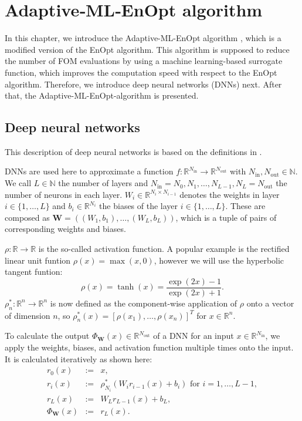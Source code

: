 \chapter{Adaptive‑ML‑EnOpt algorithm}

In this chapter, we introduce the Adaptive-ML-EnOpt algorithm \cite{Keil2022-dj}, which is a modified version of the EnOpt algorithm. This algorithm is supposed to reduce the number of FOM evaluations by using a machine learning-based surrogate function, which improves the computation speed with respect to the EnOpt algorithm. Therefore, we introduce deep neural networks (DNNs) next. After that, the Adaptive-ML-EnOpt-algorithm is presented.

\section{Deep neural networks}

This description of deep neural networks is based on the definitions in \cite{Keil2022-dj}.

DNNs are used here to approximate a function $f:\mathbb{R}^{N_{\mathrm{in}}}\to\mathbb{R}^{N_{\mathrm{out}}}$ with $N_{\mathrm{in}},N_{\mathrm{out}}\in\mathbb{N}$. We call $L\in\mathbb{N}$ the number of layers and $N_{\mathrm{in}}=N_0,N_1,\dotsc,N_{L-1}, N_L=N_{\mathrm{out}}$ the number of neurons in each layer. $W_i\in\mathbb{R}^{N_i\times N_{i-1}}$ denotes the weights in layer $i\in\{1,\dotsc,L\}$ and $b_i\in\mathbb{R}^{N_i}$ the biases of the layer $i\in\{1,\dotsc,L\}$. These are composed as $\mathbf{W}=\left((W_1,b_1),\dotsc,(W_L,b_L)\right)$, which is a tuple of pairs of corresponding weights and biases.

$\rho:\mathbb{R}\to\mathbb{R}$ is the so-called activation function. A popular example is the rectified linear unit funtion $\rho(x)=\operatorname{max}(x,0)$, however we will use the hyperbolic tangent funtion:
\begin{displaymath}
\rho(x)=\tanh(x)=\frac{\exp(2x)-1}{\exp(2x)+1}.
\end{displaymath}
$\rho_n^*:\mathbb{R}^n\to\mathbb{R}^n$ is now defined as the component-wise application of $\rho$ onto a vector of dimension $n$, so $\rho_n^*(x)=\left[\rho(x_1),\dotsc,\rho(x_n)\right]^T$ for $x\in\mathbb{R}^n$.

To calculate the output $\Phi_\mathbf{W}(x)\in\mathbb{R}^{N_{\mathrm{out}}}$ of a DNN for an input $x\in\mathbb{R}^{N_{\mathrm{in}}}$, we apply the weights, biases, and activation function multiple times onto the input. It is calculated iteratively as shown here:
\begin{eqnarray*}
r_0(x)&:=&x,\\
r_i(x)&:=&\rho_{N_i}^*(W_ir_{i-1}(x)+b_i)\text{ for }i=1,\dotsc,L-1,\\
r_L(x)&:=&W_Lr_{L-1}(x)+b_L,\\
\Phi_\mathbf{W}(x)&:=&r_L(x).
\end{eqnarray*}

